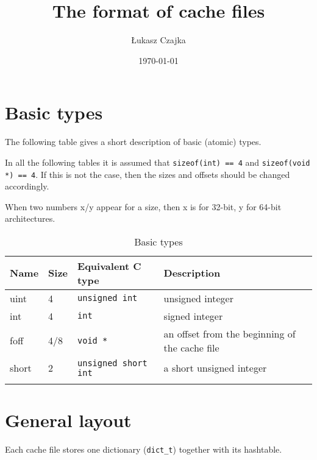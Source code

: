 \documentclass[a4paper,12pt]{article}
\begin{document}
\title{The format of cache files}
\author{Łukasz Czajka}
\date{\today}
\maketitle

\newpage

\tableofcontents

\newpage

\section{Basic types}

The following table gives a short description of basic (atomic) types.

In all the following tables it is assumed that \verb#sizeof(int) == 4#
and \verb#sizeof(void *) == 4#. If this is not the case, then the
sizes and offsets should be changed accordingly.

When two numbers x/y appear for a size, then x is for 32-bit, y for
64-bit architectures.


\begin{longtable}{|p{0.5in}|p{0.5in}|p{1.7in}|p{2.8in}|}
\hline
{\bf Name} & {\bf Size} & {\bf Equivalent C type} & {\bf Description}\\
\hline
\endhead

uint & 4 & \verb#unsigned int# & unsigned integer

\\
\hline

int & 4 & \verb#int# & signed integer

\\
\hline

foff & 4/8 & \verb#void *# & an offset from the beginning of the cache file

\\
\hline

short & 2 & \verb#unsigned short int# & a short unsigned integer

\\
\hline
\caption{Basic types}
\end{longtable}



\section{General layout}

Each cache file stores one dictionary (\verb#dict_t#) together with its
hashtable.
\end{document}
